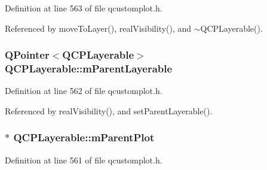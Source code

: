 Definition at line 563 of file qcustomplot.\+h.



Referenced by move\+To\+Layer(), real\+Visibility(), and $\sim$\+Q\+C\+P\+Layerable().

\hypertarget{class_q_c_p_layerable_a3291445a980053e2d17a21d15957624e}{}
\subsubsection[{m\+Parent\+Layerable}]{\setlength{\rightskip}{0pt plus 5cm}Q\+Pointer$<${\bf Q\+C\+P\+Layerable}$>$ Q\+C\+P\+Layerable\+::m\+Parent\+Layerable\hspace{0.3cm}{\ttfamily [protected]}}\label{class_q_c_p_layerable_a3291445a980053e2d17a21d15957624e}


Definition at line 562 of file qcustomplot.\+h.



Referenced by real\+Visibility(), and set\+Parent\+Layerable().

\hypertarget{class_q_c_p_layerable_aa2a528433e44db02b8aef23c1f9f90ed}{}
\subsubsection[{m\+Parent\+Plot}]{$\ast$ Q\+C\+P\+Layerable\+::m\+Parent\+Plot\hspace{0.3cm}{\ttfamily [protected]}}\label{class_q_c_p_layerable_aa2a528433e44db02b8aef23c1f9f90ed}


Definition at line 561 of file qcustomplot.\+h.



